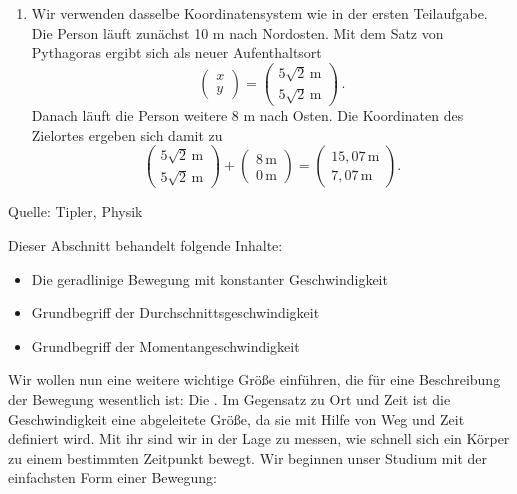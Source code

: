 \begin{MExercises}
\begin{MExercise}
\begin{MSolution}
\begin{enumerate}
\item  Wir verwenden dasselbe Koordinatensystem wie in der ersten Teilaufgabe. Die Person l\"auft zun\"achst 10 m nach Nordosten. Mit dem Satz von Pythagoras ergibt sich als neuer Aufenthaltsort
\begin{equation*}
\left(\begin{array}{c} x \\ y \end{array}\right)=\left(\begin{array}{c} 5\sqrt{2}\,\text{m} \\ 5\sqrt{2}\,\text{m} \end{array}\right)\,. 
\end{equation*} Danach l\"auft die Person weitere 8 m nach Osten. Die Koordinaten des Zielortes ergeben sich damit zu
\begin{equation*}
\left(\begin{array}{c} 5\sqrt{2}\,\text{m} \\ 5\sqrt{2}\,\text{m} \end{array}\right)+\left(\begin{array}{c} 8\,\text{m} \\ 0\,\text{m} \end{array}\right)= \left(\begin{array}{c} {15,07}\,\text{m} \\{7,07}\,\text{m} \end{array}\right).
\end{equation*} 
\end{enumerate}
\end{MSolution}

Quelle: Tipler, Physik
\end{MExercise}
\end{MExercises}




\begin{MIntro} 

Dieser Abschnitt behandelt folgende Inhalte:
\begin{itemize}
\item{Die geradlinige Bewegung mit konstanter Geschwindigkeit}
\item{Grundbegriff der Durchschnittsgeschwindigkeit}
\item{Grundbegriff der Momentangeschwindigkeit}
\end{itemize}


Wir wollen nun eine weitere wichtige Gr\"o{\ss}e einf\"uhren, die f\"ur eine Beschreibung der Bewegung wesentlich ist: Die . Im Gegensatz zu Ort und Zeit ist die Geschwindigkeit eine abgeleitete Gr\"o{\ss}e, da sie mit Hilfe von Weg und Zeit definiert wird. Mit ihr sind wir in der Lage zu messen, wie schnell sich ein K\"orper zu einem bestimmten  Zeitpunkt bewegt. Wir beginnen unser Studium mit der einfachsten Form einer Bewegung:
\end{MIntro}

